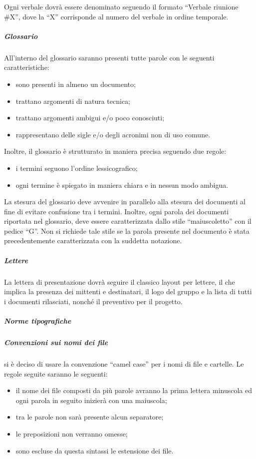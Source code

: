 					Ogni verbale dovrà essere denominato seguendo il formato ``Verbale riunione \#X'', dove la ``X'' corrisponde al numero del verbale in ordine temporale.
				\subparagraph{Glossario}
					All'interno del glossario saranno presenti tutte parole con le seguenti caratteristiche:
					\begin{itemize}
						\item sono presenti in almeno un documento;
						\item trattano argomenti di natura tecnica;
						\item trattano argomenti ambigui e/o poco conosciuti;
						\item rappresentano delle sigle e/o degli acronimi non di uso comune.
					\end{itemize}
					Inoltre, il glossario è strutturato in maniera precisa seguendo due regole:
					\begin{itemize}
						\item i termini seguono l'ordine lessicografico;
						\item ogni termine è spiegato in maniera chiara e in nessun modo ambigua.
					\end{itemize}
					La stesura del glossario deve avvenire in parallelo alla stesura dei documenti al fine di evitare confusione tra i termini. Inoltre, ogni parola dei documenti riportata nel glossario, deve essere caratterizzata dallo stile ``maiuscoletto'' con il pedice ``G''. Non si richiede tale stile se la parola presente nel documento è stata precedentemente caratterizzata con la suddetta notazione.
				\subparagraph{Lettere}
					La lettera di presentazione dovrà seguire il classico layout per lettere, il che implica la presenza dei mittenti e destinatari, il logo del gruppo e la lista di tutti i documenti rilasciati, nonché il preventivo per il progetto.
			\subparagraph{Norme tipografiche}
				\subparagraph{Convenzioni sui nomi dei file}
					si è deciso di usare la convenzione ``camel case'' per i nomi di file e cartelle. Le regole seguite saranno le seguenti:
					\begin{itemize}
						\item il nome dei file composti da più parole avranno la prima lettera minuscola ed ogni parola in seguito inizierà con una maiuscola;
						\item tra le parole non sarà presente alcun separatore;
						\item le preposizioni non verranno omesse;
						\item sono escluse da questa sintassi le estensione dei file.
					\end{itemize}
